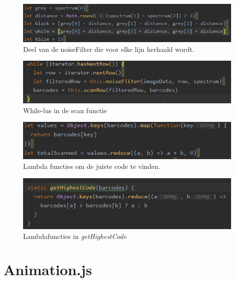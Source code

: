 \documentclass[a4paper,11pt]{article}
\begin{document}
\begin{figure}
	\centering
	\includegraphics{img/noiseFilter}
	\caption{Deel van de noiseFilter die voor elke lijn herhaald wordt.}
	\label{noiseFilter}
\end{figure}

\begin{figure}
	\centering
	\includegraphics{img/startFilter}
	\caption{While-lus in de scan functie}
	\label{startFilter}
\end{figure}
\begin{figure}
	\centering
	\includegraphics{img/lambda}
	\caption{Lambda functies om de juiste code te vinden.}
	\label{lambda}
\end{figure}
\begin{figure}
	\centering
	\includegraphics{img/getHighestCode}
	\caption{Lambdafuncties in {\it getHighestCode}}
	\label{getHighestCode}
\end{figure}

\section{Animation.js}
\end{document}
